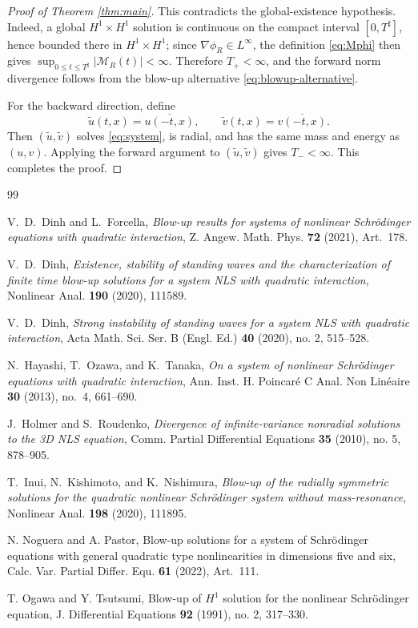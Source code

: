 \documentclass[12pt]{amsart}
\numberwithin{equation}{section}
\theoremstyle{remark}
\begin{document}
\begin{proof}[Proof of Theorem \ref{thm:main}]
This contradicts the global-existence hypothesis.  Indeed, a global $H^1\times H^1$ solution is continuous on the compact interval $[0,T^\sharp]$, hence bounded there in $H^1\times H^1$; since $\nabla\phi_R\in L^\infty$, the definition \eqref{eq:Mphi} then gives $\sup_{0\le t\le T^\sharp}|\mathcal M_R(t)|<\infty$.  Therefore $T_+<\infty$, and the forward norm divergence follows from the blow-up alternative \eqref{eq:blowup-alternative}.

For the backward direction, define
\[
 \widetilde u(t,x)=\overline{u(-t,x)}, \qquad \widetilde v(t,x)=\overline{v(-t,x)}.
\]
Then $(\widetilde u,\widetilde v)$ solves \eqref{eq:system}, is radial, and has the same mass and energy as $(u,v)$.  Applying the forward argument to $(\widetilde u,\widetilde v)$ gives $T_-<\infty$.  This completes the proof.
\end{proof}


\begin{thebibliography}{99}

 V.~D.~Dinh and L.~Forcella, \emph{Blow-up results for systems of nonlinear Schr\"odinger equations with quadratic interaction},
Z. Angew. Math. Phys. \textbf{72} (2021), Art.~178.

 V.~D.~Dinh, \emph{Existence, stability of standing waves and the characterization of finite time blow-up solutions for a system NLS with quadratic interaction}, Nonlinear Anal. \textbf{190} (2020), 111589.

 V.~D.~Dinh, \emph{Strong instability of standing waves for a system NLS with quadratic interaction}, Acta Math. Sci. Ser. B (Engl. Ed.) \textbf{40} (2020), no. 2, 515--528.

 N.~Hayashi, T.~Ozawa, and K.~Tanaka, \emph{On a system of nonlinear Schr\"odinger equations with quadratic interaction}, Ann. Inst. H. Poincar\'e C Anal. Non Lin\'eaire \textbf{30} (2013), no.~4, 661--690.

 J.~Holmer and S.~Roudenko, \emph{Divergence of infinite-variance nonradial solutions to the 3D NLS equation}, Comm. Partial Differential Equations \textbf{35} (2010), no. 5, 878--905.

 T.~Inui, N.~Kishimoto, and K.~Nishimura, \emph{Blow-up of the radially symmetric solutions for the quadratic nonlinear Schr\"odinger system without mass-resonance}, Nonlinear Anal. \textbf{198} (2020), 111895.

 N. Noguera and A. Pastor, Blow-up solutions for a system of Schr\"odinger equations with general quadratic type nonlinearities in dimensions five and six, Calc. Var. Partial Differ. Equ. \textbf{61} (2022), Art.~111.

 T. Ogawa and Y. Tsutsumi, Blow-up of $H^1$ solution for the nonlinear Schr\"odinger equation, J. Differential Equations \textbf{92} (1991), no. 2, 317--330.

\end{thebibliography}
\end{document}
